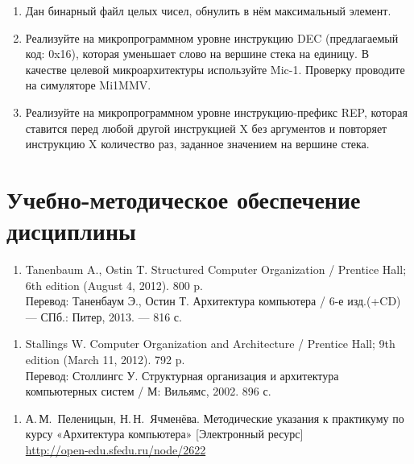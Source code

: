 \begin{enumerate}
	\item Дан бинарный файл целых чисел, обнулить в нём максимальный
	элемент.

	\item Реализуйте на микропрограммном уровне инструкцию DEC (предлагаемый
	код: 0x16), которая уменьшает слово на вершине стека на единицу. В качестве целевой микроархитектуры используйте Mic-1. Проверку проводите на симуляторе Mi1MMV.

	\item Реализуйте на микропрограммном уровне инструкцию-префикс REP, которая ставится перед любой другой инструкцией X без аргументов и повторяет инструкцию X количество раз, заданное значением на вершине стека.
\end{enumerate}

\section{Учебно-методическое обеспечение дисциплины}

	\label{main-lit}

\begin{enumerate}
	\item Tanenbaum A., Ostin T. Structured Computer Organization / Prentice Hall; 6th edition (August 4, 2012). 800 p.\\
	Перевод: Таненбаум Э., Остин Т. Архитектура компьютера / 6-е изд.(+CD) — СПб.: Питер, 2013. — 816 с.
\end{enumerate}

\begin{enumerate}
	\item Stallings W. Computer Organization and Architecture /  Prentice Hall; 9th edition (March 11, 2012). 792 p.\\
	Перевод: Столлингс У. Структурная организация и архитектура компьютерных систем / М: Вильямс, 2002. 896 с.
\end{enumerate}

	\label{author-res}
\begin{enumerate}
	\item А.\,М.~Пеленицын, Н.\,Н.~Ячменёва. Методические указания к практикуму по курсу «Архитектура компьютера» [Электронный ресурс]\\
	\url{http://open-edu.sfedu.ru/node/2622}
\end{enumerate}


